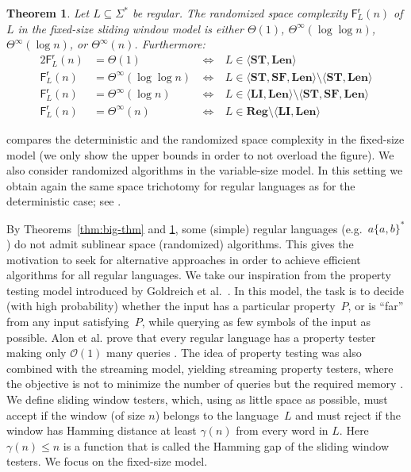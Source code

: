 \documentclass{article}\usepackage[a4paper,margin=20mm]{geometry}
\newtheorem{theorem}{Theorem}\newtheorem{lemma}[theorem]{Lemma}\newtheorem{proposition}[theorem]{Proposition}\newtheorem{corollary}[theorem]{Corollary}\newtheorem{definition}[theorem]{Definition}\newtheorem{claim}[theorem]{Claim}\newtheorem{remark}[theorem]{Remark}\newtheorem{observation}[theorem]{Observation}\newtheorem{conjecture}[theorem]{Conjecture}\newtheorem{example}[theorem]{Example}
\renewcommand{\O}{\mathcal{O}}
\newcommand{\F}{\mathsf{F}}
\renewcommand{\r}{\mathsf{r}}
\newcommand{\Reg}{\mathbf{Reg}}
\newcommand{\Len}{\mathbf{Len}}
\newcommand{\LI}{\mathbf{LI}}
\newcommand{\ST}{\mathbf{ST}}
\newcommand{\SF}{\mathbf{SF}}
\renewcommand{\leq}{\leqslant}
\newcommand{\Thetainf}{\Theta^{\scriptscriptstyle{\infty}}}
\begin{document}
\begin{theorem} \label{thm:r-char}
	Let $L \subseteq \Sigma^*$ be regular.
	The randomized space complexity $\F^\r_L(n)$ of $L$
	in the fixed-size sliding window model is either
	$\Theta(1)$, $\Thetainf(\log \log n)$, $\Thetainf(\log n)$, or $\Thetainf(n)$.
	Furthermore:
	\begin{alignat*}{2}
        \F^\r_L(n)  &= \Theta(1) & \ \iff \ & L \in \langle \ST, \Len \rangle \\
        \F^\r_L(n) &= \Thetainf(\log \log n) & \ \iff \ & L \in \langle \ST, \SF, \Len \rangle \setminus \langle \ST, \Len \rangle \\
        \F^\r_L(n) &= \Thetainf(\log n) & \ \iff \ & L \in \langle \LI, \Len \rangle \setminus \langle \ST, \SF, \Len \rangle \\
        \F^\r_L(n) &= \Thetainf(n) & \ \iff \ & L \in \Reg \setminus  \langle \LI, \Len \rangle
         \end{alignat*}
\end{theorem}

 compares the deterministic and the randomized space complexity in the fixed-size model (we only show the upper bounds in order
to not overload the figure).
We also consider randomized algorithms in the variable-size model.
In this setting we obtain again the same space trichotomy for regular languages 
as for the deterministic case; see .


By Theorems~\ref{thm:big-thm} and \ref{thm:r-char}, some (simple) regular languages
(e.g.~$a \{a,b\}^*$) do not admit sublinear space (randomized) algorithms.
This gives the motivation to seek for alternative approaches in order to
achieve efficient algorithms for all regular languages.
We take our inspiration from the property testing model introduced by Goldreich et al.~\cite{GoldreichGR98}.
In this model, the task is to decide (with high probability)
whether the input has a particular property~$P$,
or is ``far'' from any input satisfying~$P$, while querying as few symbols of the input as possible.
Alon et al. prove that every regular language has a property tester
making only $\O(1)$ many queries \cite{AlonKNS00}.
The idea of property testing was also combined with the streaming model,
yielding streaming property testers,
where the objective is not to minimize the number of queries but the required memory
\cite{FeigenbaumKSV02,FrancoisMRS16}.
We define sliding window testers,
which, using as little space as possible,
must accept if the window (of size $n$) belongs to the language~$L$
and must reject if the window has Hamming distance at least $\gamma(n)$ from every
word in $L$. Here $\gamma(n) \leq n$ is a function that is called the Hamming gap of
the sliding window testers. We focus on the fixed-size model.
\end{document}
